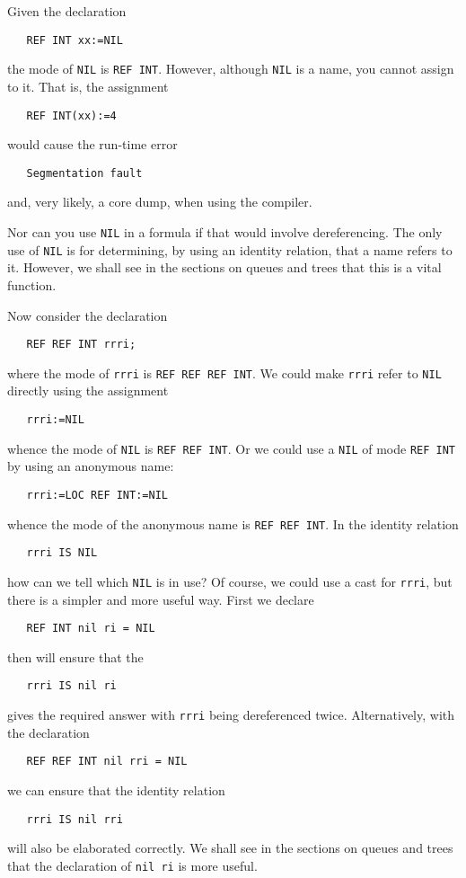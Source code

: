 Given the declaration
\begin{verbatim}
   REF INT xx:=NIL
\end{verbatim}
\noindent
the mode of \verb|NIL| is \verb|REF INT|. However, although
\verb|NIL| is a name, you cannot assign to it. That is, the assignment
\begin{verbatim}
   REF INT(xx):=4
\end{verbatim}
\noindent
would cause the run-time error
\begin{verbatim}
   Segmentation fault
\end{verbatim}
\noindent
and, very likely, a core dump, when using the
 compiler.

Nor can you use \verb|NIL| in a formula if that would involve
dereferencing.  The only use of \verb|NIL| is for determining, by
using an identity relation, that a name refers to it.  However, we
shall see in the sections on queues and trees that this is a vital
function.

Now consider the declaration
\begin{verbatim}
   REF REF INT rrri;
\end{verbatim}
\noindent
where the mode of \verb|rrri| is \verb|REF REF REF INT|. We could make
\verb|rrri| refer to \verb|NIL| directly using the assignment
\begin{verbatim}
   rrri:=NIL
\end{verbatim}
\noindent
whence the mode of \verb|NIL| is \verb|REF REF INT|. Or we could use a
\verb|NIL| of mode \verb|REF INT| by using an anonymous name:
\begin{verbatim}
   rrri:=LOC REF INT:=NIL
\end{verbatim}
\noindent
whence the mode of the anonymous name is \verb|REF REF INT|. In the
identity relation
\begin{verbatim}
   rrri IS NIL
\end{verbatim}
\noindent
how can we tell which \verb|NIL| is in use? Of course, we could use a
cast for \verb|rrri|, but there is a simpler and more useful way. First
we declare
\begin{verbatim}
   REF INT nil ri = NIL
\end{verbatim}
\noindent
then  will ensure that the
\begin{verbatim}
   rrri IS nil ri
\end{verbatim}
\noindent
gives the required answer with \verb|rrri| being dereferenced twice.
Alternatively, with the declaration
\begin{verbatim}
   REF REF INT nil rri = NIL
\end{verbatim}
\noindent
we can ensure that the identity relation
\begin{verbatim}
   rrri IS nil rri
\end{verbatim}
\noindent
will also be elaborated correctly. We shall see in the sections on
queues and trees that the declaration of \verb|nil ri| is more useful.

